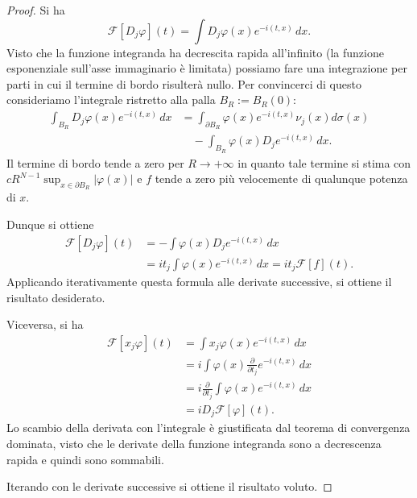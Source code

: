 \documentclass[italian,a4paper,oneside,headinclude]{scrbook}
\renewcommand{\phi}{\varphi}
\newcommand{\F}{\mathcal F}
\newcommand{\abs}[1]{{\left|#1\right|}}
\newcommand{\defeq}{:=}
\begin{document}
\begin{proof}
    Si ha
    \[
    \F[D_j \phi](t)
    = \int D_j \phi(x) e^{-i(t,x)}\, dx.
    \]
    Visto che la funzione integranda ha decrescita rapida
    all'infinito (la funzione esponenziale sull'asse immaginario
    è limitata)
    possiamo fare una integrazione per parti in cui il termine di
    bordo risulterà nullo.
    Per convincerci di questo consideriamo l'integrale
    ristretto alla palla $B_R\defeq B_R(0)$:
    \begin{align*}
      \int_{B_R} D_j \phi(x) e^{-i(t,x)}\, dx
      &= \int_{\partial B_R} \phi(x) e^{-i(t,x)} \nu_j(x) d\sigma(x)\\
      & \quad - \int_{B_R} \phi(x) D_j e^{-i(t,x)}\, dx.
    \end{align*}
    Il termine di bordo tende a zero per $R\to +\infty$ in quanto tale
    termine si stima con
    $c R^{N-1} \sup_{x\in \partial B_R} \abs{\phi(x)}$
    e $f$ tende a zero più velocemente di qualunque potenza di $x$.

    Dunque si ottiene
    \begin{align*}
    \F[ D_j \phi](t)
    &= -\int \phi(x) D_j e^{-i(t,x)}\, dx\\
    &= i t_j \int \phi(x) e^{-i(t,x)}\, dx = i t_j \F[f](t).
    \end{align*}
    Applicando iterativamente questa formula alle derivate successive,
    si ottiene il risultato desiderato.

    Viceversa, si ha
    \begin{align*}
      \F[x_j\phi](t)
      &= \int x_j \phi(x) e^{-i(t,x)}\, dx\\
      &= i\int \phi(x) \frac{\partial}{\partial t_j} e^{-i(t,x)}\, dx\\
      &= i\frac{\partial}{\partial t_j}\int \phi(x)  e^{-i(t,x)}\, dx\\
      &= i D_j \F[\phi](t).
    \end{align*}
    Lo scambio della derivata con l'integrale è giustificata dal
    teorema di convergenza dominata, visto che le derivate della
    funzione integranda sono a decrescenza rapida e quindi sono sommabili.

    Iterando con le derivate successive si ottiene il risultato
    voluto.
\end{proof}
\end{document}

